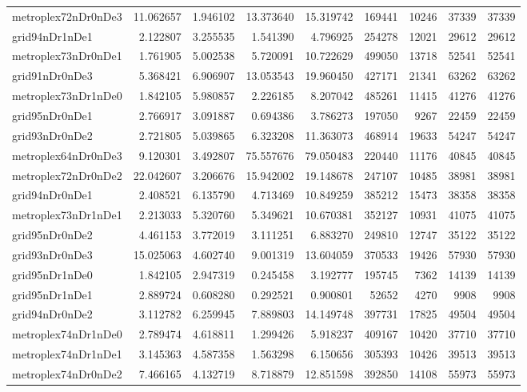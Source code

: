 \begin{longtable}{|l|r|r|r|r|r|r|r|r|}
metroplex72nDr0nDe3 & 11.062657 & 1.946102 & 13.373640 & 15.319742 & 169441 & 10246 & 37339 & 37339 \\
grid94nDr1nDe1 & 2.122807 & 3.255535 & 1.541390 & 4.796925 & 254278 & 12021 & 29612 & 29612 \\
metroplex73nDr0nDe1 & 1.761905 & 5.002538 & 5.720091 & 10.722629 & 499050 & 13718 & 52541 & 52541 \\
grid91nDr0nDe3 & 5.368421 & 6.906907 & 13.053543 & 19.960450 & 427171 & 21341 & 63262 & 63262 \\
metroplex73nDr1nDe0 & 1.842105 & 5.980857 & 2.226185 & 8.207042 & 485261 & 11415 & 41276 & 41276 \\
grid95nDr0nDe1 & 2.766917 & 3.091887 & 0.694386 & 3.786273 & 197050 & 9267 & 22459 & 22459 \\
grid93nDr0nDe2 & 2.721805 & 5.039865 & 6.323208 & 11.363073 & 468914 & 19633 & 54247 & 54247 \\
metroplex64nDr0nDe3 & 9.120301 & 3.492807 & 75.557676 & 79.050483 & 220440 & 11176 & 40845 & 40845 \\
metroplex72nDr0nDe2 & 22.042607 & 3.206676 & 15.942002 & 19.148678 & 247107 & 10485 & 38981 & 38981 \\
grid94nDr0nDe1 & 2.408521 & 6.135790 & 4.713469 & 10.849259 & 385212 & 15473 & 38358 & 38358 \\
metroplex73nDr1nDe1 & 2.213033 & 5.320760 & 5.349621 & 10.670381 & 352127 & 10931 & 41075 & 41075 \\
grid95nDr0nDe2 & 4.461153 & 3.772019 & 3.111251 & 6.883270 & 249810 & 12747 & 35122 & 35122 \\
grid93nDr0nDe3 & 15.025063 & 4.602740 & 9.001319 & 13.604059 & 370533 & 19426 & 57930 & 57930 \\
grid95nDr1nDe0 & 1.842105 & 2.947319 & 0.245458 & 3.192777 & 195745 & 7362 & 14139 & 14139 \\
grid95nDr1nDe1 & 2.889724 & 0.608280 & 0.292521 & 0.900801 & 52652 & 4270 & 9908 & 9908 \\
grid94nDr0nDe2 & 3.112782 & 6.259945 & 7.889803 & 14.149748 & 397731 & 17825 & 49504 & 49504 \\
metroplex74nDr1nDe0 & 2.789474 & 4.618811 & 1.299426 & 5.918237 & 409167 & 10420 & 37710 & 37710 \\
metroplex74nDr1nDe1 & 3.145363 & 4.587358 & 1.563298 & 6.150656 & 305393 & 10426 & 39513 & 39513 \\
metroplex74nDr0nDe2 & 7.466165 & 4.132719 & 8.718879 & 12.851598 & 392850 & 14108 & 55973 & 55973 \\

\end{longtable}
